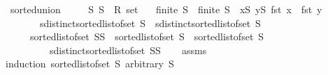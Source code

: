 \begin{isabellebody}
\isanewline
{}\isamarkupfalse%
\ sorted{\isacharunderscore}{\kern0pt}union{\isacharcolon}{\kern0pt}\isanewline
\ \ \ \ \ S{}\ S{}\ {\isacharcolon}{\kern0pt}{\isacharcolon}{\kern0pt}\ {\isachardoublequoteopen}R{}\ set{\isachardoublequoteclose}\isanewline
\ \ \ {\isachardoublequoteopen}finite\ S{}{\isachardoublequoteclose}\ \ {\isachardoublequoteopen}finite\ S{}{\isachardoublequoteclose}\ \ {\isachardoublequoteopen}{\isasymforall}x{\isasymin}S{}{\isachardot}{\kern0pt}\ {\isasymforall}y{\isasymin}S{}{\isachardot}{\kern0pt}\ fst\ x\ {\isacharless}{\kern0pt}\ fst\ y{\isachardoublequoteclose}\isanewline
\ \ \ \ \ \ \ {\isachardoublequoteopen}sdistinct{\isacharparenleft}{\kern0pt}sorted{\isacharunderscore}{\kern0pt}list{\isacharunderscore}{\kern0pt}of{\isacharunderscore}{\kern0pt}set\ S{}{\isacharparenright}{\kern0pt}{\isachardoublequoteclose}\ \ {\isachardoublequoteopen}sdistinct{\isacharparenleft}{\kern0pt}sorted{\isacharunderscore}{\kern0pt}list{\isacharunderscore}{\kern0pt}of{\isacharunderscore}{\kern0pt}set\ S{}{\isacharparenright}{\kern0pt}{\isachardoublequoteclose}\isanewline
\ \ \ \ \ {\isachardoublequoteopen}sorted{\isacharunderscore}{\kern0pt}list{\isacharunderscore}{\kern0pt}of{\isacharunderscore}{\kern0pt}set\ {\isacharparenleft}{\kern0pt}S{}{\isasymunion}S{}{\isacharparenright}{\kern0pt}\ {\isacharequal}{\kern0pt}\ {\isacharparenleft}{\kern0pt}sorted{\isacharunderscore}{\kern0pt}list{\isacharunderscore}{\kern0pt}of{\isacharunderscore}{\kern0pt}set\ S{}{\isacharparenright}{\kern0pt}\ {\isacharat}{\kern0pt}\ {\isacharparenleft}{\kern0pt}sorted{\isacharunderscore}{\kern0pt}list{\isacharunderscore}{\kern0pt}of{\isacharunderscore}{\kern0pt}set\ S{}{\isacharparenright}{\kern0pt}\isanewline
\ \ \ \ \ \ \ \ {\isasymand}\ sdistinct{\isacharparenleft}{\kern0pt}sorted{\isacharunderscore}{\kern0pt}list{\isacharunderscore}{\kern0pt}of{\isacharunderscore}{\kern0pt}set\ {\isacharparenleft}{\kern0pt}S{}{\isasymunion}S{}{\isacharparenright}{\kern0pt}{\isacharparenright}{\kern0pt}{\isachardoublequoteclose}\isanewline
%
\isadelimproof
\ \ %
\endisadelimproof
%
\isatagproof
{}\isamarkupfalse%
\ assms\isanewline
{}\isamarkupfalse%
{\isacharparenleft}{\kern0pt}induction\ {\isachardoublequoteopen}sorted{\isacharunderscore}{\kern0pt}list{\isacharunderscore}{\kern0pt}of{\isacharunderscore}{\kern0pt}set\ S{}{\isachardoublequoteclose}\ arbitrary{\isacharcolon}{\kern0pt}\ S{}{\isacharparenright}{\kern0pt}\isanewline

\end{isabellebody}
